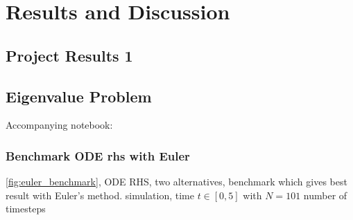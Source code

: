 \section{Results and Discussion}\label{sec:Results}

\subsection{Project Results 1}\label{sec:project results}



\subsection{Eigenvalue Problem}\label{sec:eigenvalue results}

Accompanying notebook: 


\subsubsection*{Benchmark ODE rhs with Euler}

\autoref{fig:euler_benchmark}, ODE RHS, two alternatives, benchmark which gives best result with Euler's method. simulation, time $t\in [0, 5]$ with $N = 101$ number of timesteps

